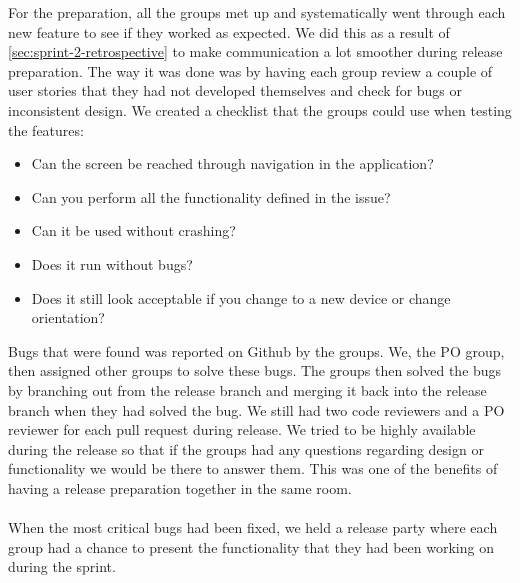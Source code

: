 For the preparation, all the groups met up and systematically went through each new feature to see if they worked as expected. We did this as a result of \autoref{sec:sprint-2-retrospective} to make communication a lot smoother during release preparation.
The way it was done was by having each group review a couple of user stories that they had not developed themselves and check for bugs or inconsistent design. 
We created a checklist that the groups could use when testing the features:
\begin{itemize}
    \item Can the screen be reached through navigation in the application?
    \item Can you perform all the functionality defined in the issue?
    \item Can it be used without crashing?
    \item Does it run without bugs?
    \item Does it still look acceptable if you change to a new device or change orientation?
\end{itemize}
Bugs that were found was reported on Github by the groups. 
We, the PO group, then assigned other groups to solve these bugs.
The groups then solved the bugs by branching out from the release branch and merging it back into the release branch when they had solved the bug. 
We still had two code reviewers and a PO reviewer for each pull request during release. 
We tried to be highly available during the release so that if the groups had any questions regarding design or functionality we would be there to answer them.
This was one of the benefits of having a release preparation together in the same room.
\\\\
When the most critical bugs had been fixed, we held a release party where each group had a chance to present the functionality that they had been working on during the sprint. 

